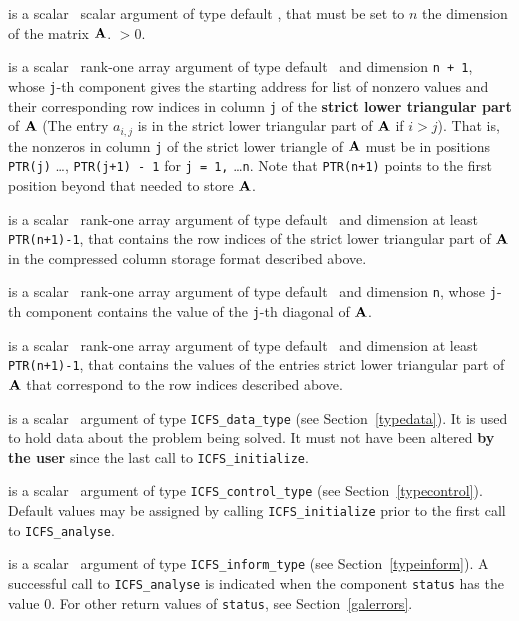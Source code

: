 \documentclass{galahad}
\newcommand{\packagename}{ICFS}
\begin{document}
\vspace*{-2mm}
\begin{description}
is a scalar \intentin\ scalar argument of type default \integer, that must be 
set to $n$ the dimension of the matrix ${\mathbf{A}}$.
 $> 0$.

 is a scalar \intentin\ rank-one array argument of type 
default \integer\ and dimension {\tt n + 1}, whose {\tt j}-th component 
gives the starting address for list of nonzero values and their 
corresponding row  indices in column {\tt j} of the 
{\bf strict lower triangular part} of ${\mathbf{A}}$ (The entry $a_{i,j}$ is in 
the strict lower triangular part of ${\mathbf{A}}$ if $i > j$).
That is, the nonzeros in column {\tt j} of the strict lower triangle of 
${\mathbf{A}}$ must be in positions {\tt PTR(j)} \ldots, {\tt PTR(j+1) - 1} for
{\tt j = 1,} \ldots {\tt n}.
Note that {\tt PTR(n+1)} points to the first position beyond that needed 
to store ${\mathbf{A}}$.

 is a scalar \intentin\ rank-one array argument of type 
default \integer\ and dimension at least {\tt  PTR(n+1)-1}, 
that contains the row indices of the strict lower triangular part of ${\mathbf{A}}$
in the compressed column storage format described above.

 is a scalar \intentin\ rank-one array argument of type 
default \realdp\ and dimension {\tt n}, whose {\tt j}-th component 
contains the value of the {\tt j}-th diagonal of ${\mathbf{A}}$.

 is a scalar \intentin\ rank-one array argument of type 
default \realdp\ and dimension at least {\tt  PTR(n+1)-1}, 
that contains the values of the entries strict lower triangular part of ${\mathbf{A}}$
that correspond to the row indices described above.

 is a scalar \intentinout\ argument of type 
{\tt \packagename\_data\_type}
(see Section~\ref{typedata}). It is used to hold data about the problem being 
solved. It must not have been altered {\bf by the user} since the last call to 
{\tt \packagename\_initialize}.

 is a scalar \intentin\ argument of type 
{\tt \packagename\_control\_type}
(see Section~\ref{typecontrol}). Default values may be assigned by calling 
{\tt \packagename\_initialize} prior to the first call to 
{\tt \packagename\_analyse}. 

 is a scalar \intentinout\ argument of type 
{\tt \packagename\_inform\_type}
(see Section~\ref{typeinform}). 
A successful call to
{\tt \packagename\_analyse}
is indicated when the  component {\tt status} has the value 0. 
For other return values of {\tt status}, see Section~\ref{galerrors}.

\end{description}
\end{document}
